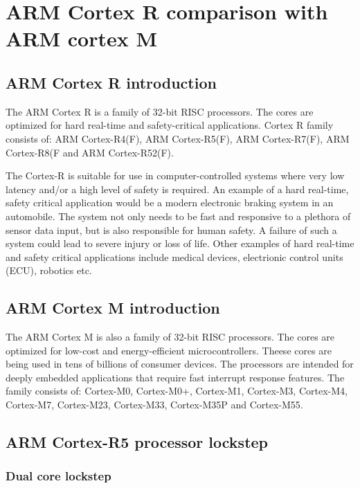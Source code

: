 \chapter{ARM Cortex R comparison with ARM cortex M}
\label{cortex_r_additions}

\section{ARM Cortex R introduction}

The ARM Cortex R is a family of 32-bit RISC processors. The cores are optimized for hard real-time and safety-critical applications. Cortex R family consists of: ARM Cortex-R4(F), ARM Cortex-R5(F), ARM Cortex-R7(F), ARM Cortex-R8(F and ARM Cortex-R52(F).

The Cortex-R is suitable for use in computer-controlled systems where very low latency and/or a high level of safety is required. An example of a hard real-time, safety critical application would be a modern electronic braking system in an automobile. The system not only needs to be fast and responsive to a plethora of sensor data input, but is also responsible for human safety. A failure of such a system could lead to severe injury or loss of life. Other examples of hard real-time and safety critical applications include medical devices, electrionic control units (ECU), robotics etc.

\section{ARM Cortex M introduction}

The ARM Cortex M is also a family of 32-bit RISC processors. The cores are optimized for low-cost and energy-efficient microcontrollers. Theese cores are being used in tens of billions of consumer devices. The processors are intended for deeply embedded applications that require fast interrupt response features. \citep{cortex_m4_reference} The family consists of: Cortex-M0, Cortex-M0+, Cortex-M1, Cortex-M3, Cortex-M4, Cortex-M7, Cortex-M23, Cortex-M33, Cortex-M35P and Cortex-M55.


\section{ARM Cortex-R5 processor lockstep}

\subsection{Dual core lockstep}

